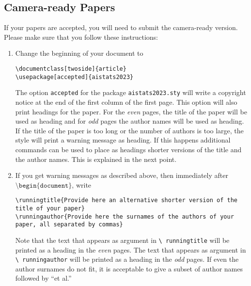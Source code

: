 \documentclass[twoside]{article}
\begin{document}
\subsection{Camera-ready Papers}


If your papers are accepted, you will need to submit the camera-ready version. Please make sure that you follow these instructions:
\begin{enumerate}
  \item Change the beginning of your document to
        \begin{flushleft}
          \texttt{\textbackslash documentclass[twoside]\{article\}}\\
          \texttt{\textbackslash usepackage[accepted]\{aistats2023\}}
        \end{flushleft}
        The option \texttt{accepted} for the package
        \texttt{aistats2023.sty} will write a copyright notice at the end of
        the first column of the first page. This option will also print
        headings for the paper.  For the \emph{even} pages, the title of
        the paper will be used as heading and for \emph{odd} pages the
        author names will be used as heading.  If the title of the paper
        is too long or the number of authors is too large, the style will
        print a warning message as heading. If this happens additional
        commands can be used to place as headings shorter versions of the
        title and the author names. This is explained in the next point.
  \item  If you get warning messages as described above, then
        immediately after $\texttt{\textbackslash
            begin\{document\}}$, write
        \begin{flushleft}
          \texttt{\textbackslash runningtitle\{Provide here an alternative
            shorter version of the title of your paper\}}\\
          \texttt{\textbackslash runningauthor\{Provide here the surnames of
            the authors of your paper, all separated by commas\}}
        \end{flushleft}
        Note that the text that appears as argument in \texttt{\textbackslash
          runningtitle} will be printed as a heading in the \emph{even}
        pages. The text that appears as argument in \texttt{\textbackslash
          runningauthor} will be printed as a heading in the \emph{odd}
        pages.  If even the author surnames do not fit, it is acceptable
        to give a subset of author names followed by ``et al.''


\end{enumerate}
\end{document}

